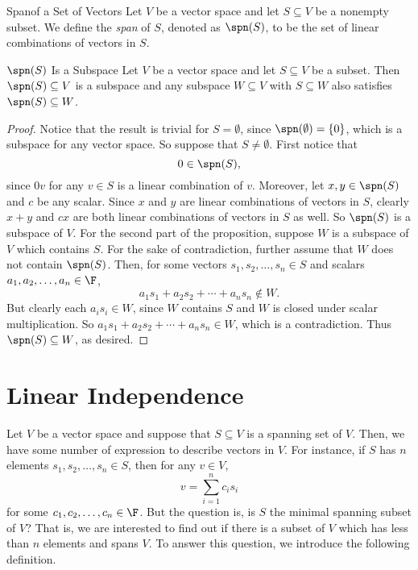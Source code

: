 \documentclass[linearalgebraI]{subfiles}
\begin{document}
    \begin{definition}{Span}{of a Set of Vectors}
        Let $V$ be a vector space and let $S\subseteq V$ be a nonempty subset. We define the \emph{span} of $S$, denoted as $\spn(S)$, to be the set of linear combinations of vectors in $S$.
    \end{definition}

    \clearpage
    \begin{prop}{$\spn(S)$ Is a Subspace}
        Let $V$ be a vector space and let $S\subseteq V$ be a subset. Then $\spn(S)\subseteq V$ is a subspace and any subspace $W\subseteq V$ with $S\subseteq W$ also satisfies $\spn(S)\subseteq W$.
    \end{prop}

    \begin{proof}
        Notice that the result is trivial for $S=\emptyset$, since $\spn(\emptyset) = \lbrace 0 \rbrace$, which is a subspace for any vector space. So suppose that $S\neq \emptyset$. First notice that
       \begin{equation*}
           0\in \spn(S), 
       \end{equation*}
       since $0v$ for any $v\in S$ is a linear combination of $v$. Moreover, let $x,y\in \spn(S)$ and $c$ be any scalar. Since $x$ and $y$ are linear combinations of vectors in $S$, clearly $x+y$ and $cx$ are both linear combinations of vectors in $S$ as well. So $\spn(S)$ is a subspace of $V$. For the second part of the proposition, suppose $W$ is a subspace of $V$ which contains $S$. For the sake of contradiction, further assume that $W$ does not contain $\spn(S)$. Then,
       for some vectors $s_1, s_2, \ldots, s_n\in S$ and scalars $a_1, a_2, \ldots, a_n\in \F$,
       \begin{equation*}
           a_1s_1 + a_2s_2 + \cdots + a_ns_n \notin W.
       \end{equation*}
       But clearly each $a_is_i\in W$, since $W$ contains $S$ and $W$ is closed under scalar multiplication. So $a_1s_1 + a_2s_2 + \cdots + a_ns_n\in W$, which is a contradiction. Thus $\spn(S)\subseteq W$, as desired.
    \end{proof}
    
    \section{Linear Independence}

    \begin{remark}
        Let $V$ be a vector space and suppose that $S\subseteq V$ is a spanning set of $V$. Then, we have some number of expression to describe vectors in $V$. For instance, if $S$ has $n$ elements $s_1, s_2, \ldots, s_n\in S$, then for any $v\in V$, 
        \begin{equation*}
            v = \sum^{n}_{i=1} c_is_i
        \end{equation*}
        for some $c_1,c_2,\ldots,c_n\in\F$. But the question is, is $S$ the minimal spanning subset of $V$? That is, we are interested to find out if there is a subset of $V$ which has less than $n$ elements and spans $V$. To answer this question, we introduce the following definition.
    \end{remark}
\end{document}
